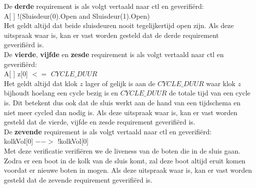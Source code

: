 \documentclass[../verslag.tex]{subfiles}
\begin{document}
De \textbf{derde} requirement is als volgt vertaald naar ctl en geverifiërd: \\
A[ ] !(Sluisdeur(0).Open and Sluisdeur(1).Open) \\

Het geldt altijd dat beide sluisdeuren nooit tegelijkertijd open zijn.
Als deze uitspraak waar is, kan er vast worden gesteld dat de derde requirement geverifiërd is. \\

De \textbf{vierde}, \textbf{vijfde} en \textbf{zesde} requirement is als volgt vertaald naar ctl en geverifiërd: \\
A[ ] z[0] $<=$ $CYCLE\_DUUR$ \\

Het geldt altijd dat klok $z$ lager of gelijk is aan de $CYCLE\_DUUR$ waar klok $z$ bijhoudt hoelang een cycle bezig is en $CYCLE\_DUUR$ de totale tijd van een cycle is.
Dit betekent dus ook dat de sluis werkt aan de hand van een tijdschema en niet meer cycled dan nodig is.
Als deze uitspraak waar is, kan er vast worden gesteld dat de vierde, vijfde en zesde requirement geverifiërd is. \\

De \textbf{zevende} requirement is als volgt vertaald naar ctl en geverifiërd: \\
kolkVol[0] $-->$ !kolkVol[0] \\

Met deze verificatie verifiëren we de liveness van de boten die in de sluis gaan. Zodra er een boot in de kolk van de sluis komt, zal deze boot altijd eruit komen voordat er nieuwe boten in mogen.
Als deze uitspraak waar is, kan er vast worden gesteld dat de zevende requirement geverifiërd is. \\
\end{document}
